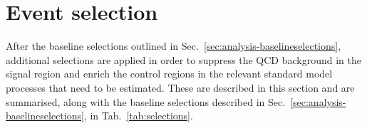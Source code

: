 



\section{Event selection}
\label{sec:analysis-eventselection}

After the baseline selections outlined in 
Sec.~\ref{sec:analysis-baselineselections}, additional selections are applied 
in order to suppress the QCD background in the signal region and enrich the 
control regions in the relevant standard model processes that need to be 
estimated. These are described in this section and are summarised, along with 
the baseline selections described in 
Sec.~\ref{sec:analysis-baselineselections}, in Tab.~\ref{tab:selections}.


